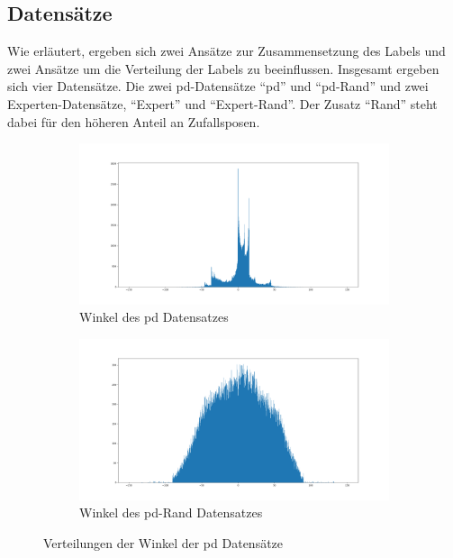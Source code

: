 \subsection{Datensätze}

Wie erläutert, ergeben sich zwei Ansätze zur Zusammensetzung des Labels und zwei Ansätze um die Verteilung der Labels zu beeinflussen. Insgesamt ergeben sich vier Datensätze. Die zwei \acs{pd}-Datensätze ``\acs{pd}'' und ``\acs{pd}-Rand'' und zwei Experten-Datensätze, ``Expert'' und ``Expert-Rand''. Der Zusatz ``Rand'' steht dabei für den höheren Anteil an Zufallsposen.\\

\begin{figure}[H]
	\centering
	\begin{subfigure}{0.5\textwidth}
		\centering
		\includegraphics[width=\linewidth]{kapitel4/images/plots/pd-angles.png}
		\caption{Winkel des \acs{pd} Datensatzes}
		\label{pd-drive-angles}
	\end{subfigure}%
	\begin{subfigure}{0.5\textwidth}
		\centering
		\includegraphics[width=\linewidth]{kapitel4/images/plots/pd-rand-angles.png}
		\caption{Winkel des \acs{pd}-Rand Datensatzes}
		\label{pd-rand-angles}
	\end{subfigure}
	\caption{Verteilungen der Winkel der \acs{pd} Datensätze}
	\label{pd-angles}
\end{figure}


